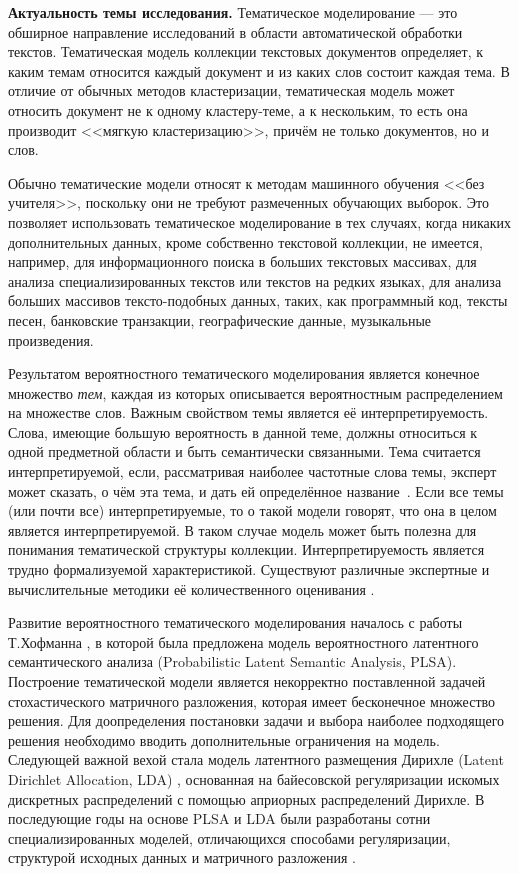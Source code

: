 
\textbf{Актуальность темы исследования.} 
Тематическое моделирование --- это обширное направление исследований в области автоматической обработки текстов. Тематическая модель коллекции текстовых документов определяет, к каким темам относится каждый документ и из каких слов состоит каждая тема. В отличие от обычных методов кластеризации, тематическая модель может относить документ не к одному кластеру-теме, а к нескольким, то есть  она производит <<мягкую кластеризацию>>, причём не только документов, но и слов. 

Обычно тематические модели относят к методам машинного обучения <<без учителя>>, поскольку они не требуют размеченных обучающих выборок. Это позволяет использовать тематическое моделирование в тех случаях, когда никаких дополнительных данных, кроме собственно текстовой коллекции, не имеется, например, для информационного поиска в больших текстовых массивах, для анализа специализированных текстов или текстов на редких языках, для анализа больших массивов тексто-подобных данных, таких, как программный код, тексты песен, банковские транзакции, географические данные, музыкальные произведения.

Результатом вероятностного тематического моделирования является конечное множество \textit{тем}, каждая из которых описывается вероятностным распределением на множестве слов. Важным свойством темы является её интерпретируемость. Слова, имеющие большую вероятность в данной теме, должны относиться к одной предметной области и быть семантически связанными. Тема считается интерпретируемой, если, рассматривая наиболее частотные слова темы, эксперт может сказать, о чём эта тема, и дать ей определённое название~\cite{rtl}. Если все темы (или почти все) интерпретируемые, то о такой модели говорят, что она в целом является интерпретируемой. В таком случае модель может быть полезна для понимания тематической структуры коллекции. Интерпретируемость является трудно формализуемой характеристикой. Существуют различные экспертные и вычислительные методики её количественного оценивания \cite{newman2010automatic}.  

Развитие вероятностного тематического моделирования началось с работы Т.Хофманна \cite{hofmann1999}, в которой была предложена модель вероятностного латентного семантического анализа (Probabilistic Latent Semantic Analysis, PLSA). Построение тематической модели является некорректно поставленной задачей стохастического матричного разложения, которая имеет бесконечное множество решения. Для доопределения постановки задачи и выбора наиболее подходящего решения необходимо вводить дополнительные ограничения на модель. Следующей важной вехой стала модель латентного размещения Дирихле (Latent Dirichlet Allocation, LDA) \cite{blei2003latent}, основанная на байесовской регуляризации искомых дискретных распределений с помощью априорных распределений Дирихле. В последующие годы на основе PLSA и LDA были разработаны сотни специализированных моделей, отличающихся способами регуляризации, структурой исходных данных и матричного разложения \cite{daud10knowledge,blei2012,fntir2017applications}. 

